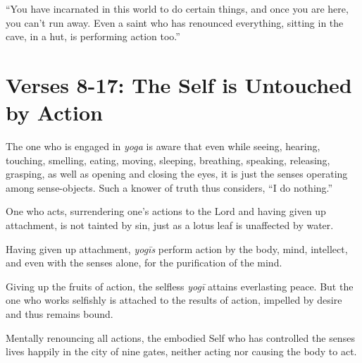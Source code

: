 \enquote{You have incarnated in this world to do certain things, and once you are here, you can’t run away. Even a saint who has renounced everything, sitting in the cave, in a hut, is performing action too.}

\newpage
\section{Verses 8-17: The Self is Untouched by Action}\label{sec-verses-8-17-the-self-is-untouched-by-action}

{The one who is engaged in \textit{yoga} is aware that even while seeing, hearing, touching, smelling, eating, moving, sleeping, breathing, speaking, releasing, grasping, as well as opening and closing the eyes, it is just the senses operating among sense-objects. Such a knower of truth thus considers, \enquote{I do nothing.}}

{One who acts, surrendering one’s actions to the Lord and having given up attachment, is not tainted by sin, just as a lotus leaf is unaffected by water.}

{Having given up attachment, \textit{yogīs} perform action by the body, mind, intellect, and even with the senses alone, for the purification of the mind.}

{Giving up the fruits of action, the selfless \textit{yogī} attains everlasting peace. But the one who works selfishly is attached to the results of action, impelled by desire and thus remains bound.}

{Mentally renouncing all actions, the embodied Self who has controlled the senses lives happily in the city of nine gates, neither acting nor causing the body to act.}

